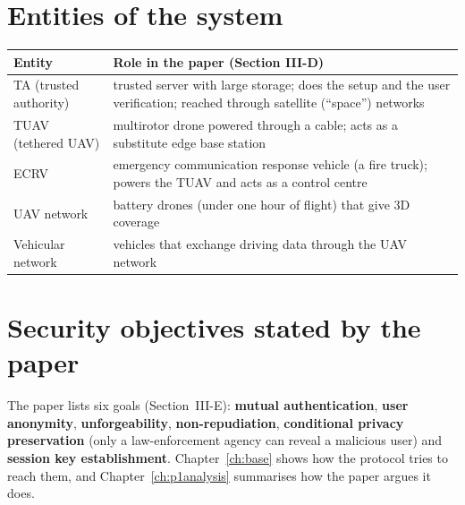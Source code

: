 \section{Entities of the system}
\begin{center}
\small
\begin{tabularx}{\linewidth}{@{}l X@{}}
\toprule
\textbf{Entity} & \textbf{Role in the paper (Section III-D)}\\
\midrule
TA (trusted authority) & trusted server with large storage; does the setup and the user verification; reached through satellite (``space'') networks\\
TUAV (tethered UAV) & multirotor drone powered through a cable; acts as a substitute edge base station\\
ECRV & emergency communication response vehicle (a fire truck); powers the TUAV and acts as a control centre\\
UAV network & battery drones (under one hour of flight) that give 3D coverage\\
Vehicular network & vehicles that exchange driving data through the UAV network\\
\bottomrule
\end{tabularx}
\end{center}

\section{Security objectives stated by the paper}
The paper lists six goals (Section~III-E): \textbf{mutual authentication}, \textbf{user anonymity}, \textbf{unforgeability}, \textbf{non-repudiation},
\textbf{conditional privacy preservation} (only a law-enforcement agency can reveal a malicious user) and \textbf{session key establishment}.
Chapter~\ref{ch:base} shows how the protocol tries to reach them, and Chapter~\ref{ch:p1analysis} summarises how the paper argues it does.
